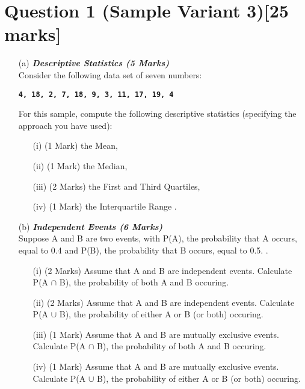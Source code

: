 \documentclass[]{article}
\begin{document}
\section*{Question 1 (Sample Variant 3)[25 marks]}

\begin{itemize}

\item[(a)] \textbf{\textit{Descriptive Statistics (5 Marks)}}\\
Consider the following data set of seven numbers:

\begin{center}
\textbf{\texttt{4, 18,  2,  7, 18,  9, 3, 11, 17, 19,  4 }}
\end{center}

\noindent For this sample, compute the following descriptive statistics (specifying the approach you have used):
\begin{itemize}
\item[(i)] (1 Mark) the Mean,
\item[(ii)] (1 Mark) the Median,
\item[(iii)] (2 Marks) the First and Third Quartiles,
\item[(iv)] (1 Mark) the Interquartile Range .
\end{itemize}

\item[(b)]\textbf{\textit{Independent Events (6 Marks)}}\\ Suppose A and B are two events, with P(A), the probability that A occurs, equal to 0.4 and P(B), the probability that B occurs, equal to 0.5. .
\begin{itemize}
\item[(i)] (2 Marks) Assume that A and B are independent events. Calculate P(A $\cap$ B), the probability of both A and B occuring. %
\item[(ii)] (2 Marks) Assume that A and B are independent events. Calculate P(A $\cup$ B), the probability of either A or B (or both) occuring.
\item[(iii)] (1 Mark)  Assume that A and B are mutually exclusive events. Calculate P(A $\cap$ B), the probability of both A and B occuring. %
\item[(iv)] (1 Mark) Assume that A and B are mutually exclusive events. Calculate P(A $\cup$ B), the probability of either A or B (or both) occuring.
\end{itemize}



\end{itemize}
\end{document}
